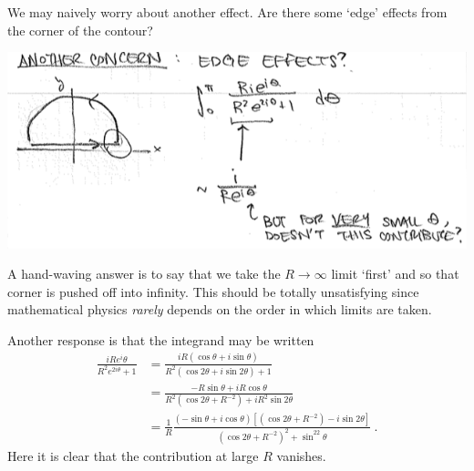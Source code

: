 \begin{example}
We may naively worry about another effect. Are there some `edge' effects from the corner of the contour?
\begin{center}
\includegraphics[width=.9\textwidth]{figures/Lec_2017_corner.png}
\end{center}
A hand-waving answer is to say that we take the $R\to\infty$ limit `first' and so that corner is pushed off into infinity. This should be totally unsatisfying since mathematical physics \emph{rarely} depends on the order in which limits are taken.  

Another response is that the integrand may be written
\begin{align}
  \frac{iR e{^i\theta}}{R^2 e^{2i\theta}+1}
  &=
  \frac{iR \left(\cos\theta + i \sin\theta\right)}{R^2(\cos2\theta + i\sin2\theta)+1}
  \\
  &=
  \frac{-R \sin\theta + iR \cos\theta}{R^2(\cos2\theta +R^{-2}) + iR^2\sin2\theta}
  \\
  &=
  \frac{1}{R}
  \frac{\left(-\sin\theta + i\cos\theta\right)
  \left[(\cos2\theta +R^{-2}) - i\sin2\theta\right]
  }{(\cos2\theta +R^{-2})^2 + \sin^22\theta} \ .
\end{align}
Here it is clear that the contribution at large $R$ vanishes.
\end{example}


